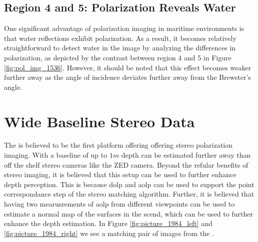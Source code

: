\subsection{Region 4 and 5: Polarization Reveals Water}
One significant advantage of polarization imaging in maritime environments is that water reflections exhibit polarization.
As a result, it becomes relatively straightforward to detect water in the image by analyzing the differences in polarization, as depicted by the contrast between region 4 and 5 in Figure \ref{fig:pol_img_1536}.
However, it should be noted that this effect becomes weaker further away as the angle of incidence deviates further away from the Brewster's angle.


\section{Wide Baseline Stereo Data}
The \sr is believed to be the first platform offering offering stereo polarization imaging.
With a baseline of up to $1m$ depth can be estimated further away than off the shelf stereo cameras like the ZED camera.
Beyond the refular benefits of stereo imaging, it is believed that this setup can be used to further enhance depth perception.
This is because \gls{dolp} and \gls{aolp} can be used to support the point correspondance step of the stereo matching algorithm.
Further, it is believed that having two mearusrements of \gls{aolp} from different viewpoints can be used to estimate a normal map of the surfaces in the scend, which can be used to further enhance the depth estimation.
In Figure \ref{fig:picture_1984_left} and \ref{fig:picture_1984_right} we see a matching pair of images from the \sr.
